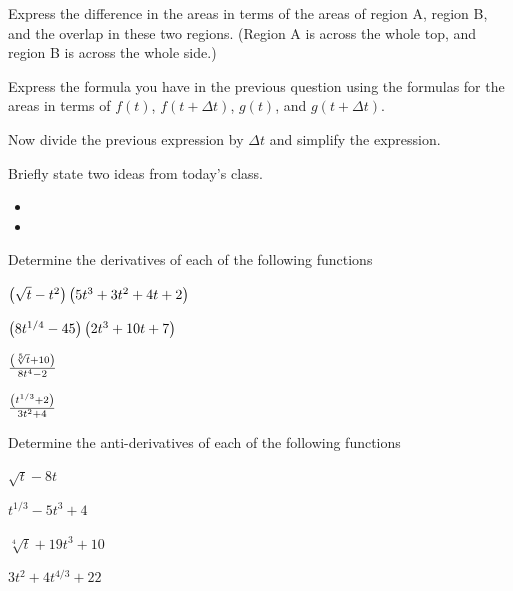 \begin{problem}
  \scalebox{0.55}{}

  \begin{subproblem}
    \item Express the difference in the areas in terms of the areas of
      region A, region B, and the overlap in these two
      regions. (Region A is across the whole top, and region B is
      across the whole side.)
      \vfill

    \item Express the formula you have in the previous question using
      the formulas for the areas in terms of $f(t)$, $f(t+\Delta t)$,
      $g(t)$, and $g(t+\Delta t)$.
      \vfill

    \item Now divide the previous expression by $\Delta t$ and
      simplify the expression.
      \vfill

  \end{subproblem}
  

\end{problem}

\postClass

\begin{problem}
\item Briefly state two ideas from today's class.
  \begin{itemize}
  \item 
  \item 
  \end{itemize}
\item Determine the derivatives of each of the following functions
  \begin{subproblem}
    \item $\left( \sqrt{t} - t^2 \right) \left( 5 t^3 + 3 t^2 + 4t +2 \right)$
      \vfill
    \item $\left( 8 t^{1/4} - 45 \right) \left( 2 t^3 + 10 t + 7 \right)$
      \vfill
    \item $\frac{\left( \sqrt[5]{t}+10 \right)}{8t^4-2}$
      \vfill
    \item $\frac{\left( t^{1/3}+2 \right)}{3t^2+4}$
      \vfill
  \end{subproblem}
  \clearpage
\item Determine the anti-derivatives of each of the following functions
  \begin{subproblem}
    \item $\sqrt{t} - 8t$
      \vfill
    \item $t^{1/3} - 5 t^3 + 4$
      \vfill
    \item $\sqrt[4]{t} + 19 t^3 + 10$
      \vfill
    \item $3 t^2 + 4 t^{4/3} + 22$
      \vfill
  \end{subproblem}

  \vfill

\end{problem}



